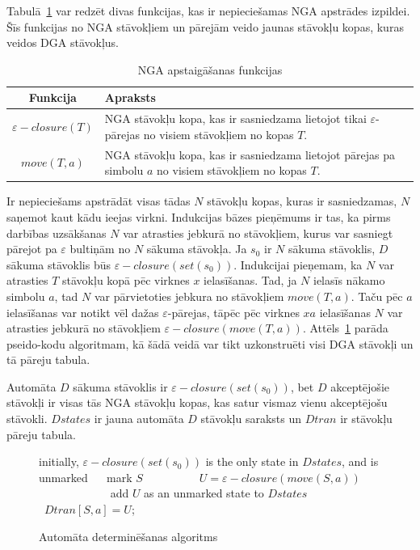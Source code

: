 Tabulā~\ref{fig:NGAoperations} var redzēt divas funkcijas, kas ir nepieciešamas NGA apstrādes izpildei. Šīs funkcijas no NGA stāvokļiem un pārejām veido jaunas stāvokļu kopas, kuras veidos DGA stāvokļus.

\begin{table}[H]
  \caption{NGA apstaigāšanas funkcijas}
  \centering
  \begin{tabular}{|c|p{350pt}|}
    \hline
    Funkcija & Apraksts \\ \hline
    $\varepsilon-closure (T)$ & 
    NGA stāvokļu kopa, kas ir sasniedzama lietojot tikai $\varepsilon$-pārejas no visiem stāvokļiem no kopas $T$. \\ \hline
    $move (T, a)$ & 
    NGA stāvokļu kopa, kas ir sasniedzama lietojot pārejas pa simbolu $a$ no visiem stāvokļiem no kopas $T$. \\
    \hline
  \end{tabular}
\label{fig:NGAoperations}
\end{table}

Ir nepieciešams apstrādāt visas tādas $N$ stāvokļu kopas, kuras ir sasniedzamas, $N$ saņemot kaut kādu ieejas virkni. Indukcijas bāzes pieņēmums ir tas, ka pirms darbības uzsākšanas $N$ var atrasties jebkurā no stāvokļiem, kurus var sasniegt pārejot pa $\varepsilon$ bultiņām no $N$ sākuma stāvokļa. Ja $s_0$ ir $N$ sākuma stāvoklis, $D$ sākuma stāvoklis būs $\varepsilon-closure (set (s_0))$. Indukcijai pieņemam, ka $N$ var atrasties $T$ stāvokļu kopā pēc virknes $x$ ielasīšanas. Tad, ja $N$ ielasīs nākamo simbolu $a$, tad $N$ var pārvietoties jebkura no stāvokļiem $move (T, a)$. Taču pēc $a$ ielasīšanas var notikt vēl dažas $\varepsilon$-pārejas, tāpēc pēc virknes $xa$ ielasīšanas $N$ var atrasties jebkurā no stāvokļiem $\varepsilon-closure (move (T, a))$. Attēls~\ref{fig:det_algorithm} parāda pseido-kodu algoritmam, kā šādā veidā var tikt uzkonstruēti visi DGA stāvokļi un tā pāreju tabula.

Automāta $D$ sākuma stāvoklis ir $\varepsilon-closure (set (s_0))$, bet $D$ akceptējošie stāvokļi ir visas tās NGA stāvokļu kopas, kas satur vismaz vienu akceptējošu stāvokli. $Dstates$ ir jauna automāta $D$ stāvokļu saraksts un $Dtran$ ir stāvokļu pāreju tabula.

\begin{figure}[H]
  \begin{algorithmic}
  \State initially, $\varepsilon-closure (set (s_0))$  is the only state in $Dstates$, and is unmarked
      \State mark $S$
          \State $U = \varepsilon-closure (move (S, a))$
              \State add $U$ as an unmarked state to $Dstates$
          \EndIf
          \State $Dtran [S, a] = U$;
      \EndFor
  \EndWhile
  \end{algorithmic}
  \caption{\label{fig:det_algorithm}Automāta determinēšanas algoritms}
\end{figure}

